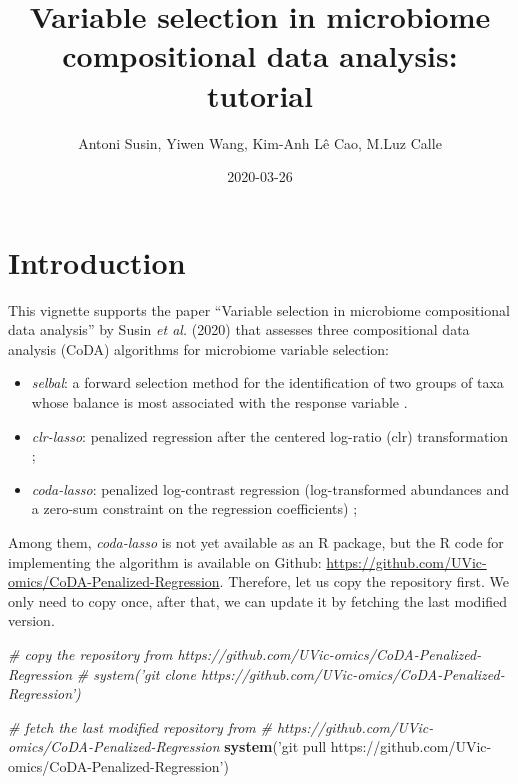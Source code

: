 \documentclass[openany]{book}
\title{Variable selection in microbiome compositional data analysis: tutorial}
\author{Antoni Susin, Yiwen Wang, Kim-Anh Lê Cao, M.Luz Calle}
\date{2020-03-26}
\newenvironment{Shaded}{\begin{snugshade}}{\end{snugshade}}
\newcommand{\KeywordTok}[1]{\textcolor[rgb]{0.13,0.29,0.53}{\textbf{#1}}}
\newcommand{\StringTok}[1]{\textcolor[rgb]{0.31,0.60,0.02}{#1}}
\newcommand{\CommentTok}[1]{\textcolor[rgb]{0.56,0.35,0.01}{\textit{#1}}}
\newcommand{\NormalTok}[1]{#1}
\providecommand{\tightlist}{%
  \setlength{\itemsep}{0pt}\setlength{\parskip}{0pt}}
\begin{document}
\maketitle

{
\hypersetup{linkcolor=black}
\setcounter{tocdepth}{3}
\tableofcontents
}
\chapter{Introduction}\label{introduction}

This vignette supports the paper ``Variable selection in microbiome
compositional data analysis'' by Susin \emph{et al.} (2020) that
assesses three compositional data analysis (CoDA) algorithms for
microbiome variable selection:

\begin{itemize}
\tightlist
\item
  \emph{selbal}: a forward selection method for the identification of
  two groups of taxa whose balance is most associated with the response
  variable \citep{rivera2018balances}.
\item
  \emph{clr-lasso}: penalized regression after the centered log-ratio
  (clr) transformation
  \citep{zou2005regularization, tibshirani1996regression, le1992ridge};
\item
  \emph{coda-lasso}: penalized log-contrast regression (log-transformed
  abundances and a zero-sum constraint on the regression coefficients)
  \citep{lu2019generalized, lin2014variable};
\end{itemize}

Among them, \emph{coda-lasso} is not yet available as an R package, but
the R code for implementing the algorithm is available on Github:
\url{https://github.com/UVic-omics/CoDA-Penalized-Regression}.
Therefore, let us copy the repository first. We only need to copy once,
after that, we can update it by fetching the last modified version.

\begin{Shaded}
\begin{Highlighting}[]
\CommentTok{# copy the repository from https://github.com/UVic-omics/CoDA-Penalized-Regression}
\CommentTok{# system('git clone https://github.com/UVic-omics/CoDA-Penalized-Regression')}

\CommentTok{# fetch the last modified repository from }
\CommentTok{# https://github.com/UVic-omics/CoDA-Penalized-Regression}
\KeywordTok{system}\NormalTok{(}\StringTok{'git pull https://github.com/UVic-omics/CoDA-Penalized-Regression'}\NormalTok{)}
\end{Highlighting}
\end{Shaded}
\end{document}

